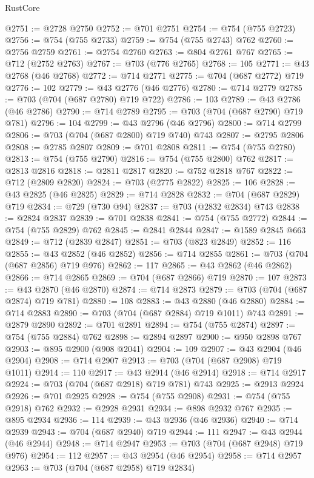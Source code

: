\begin{lexlean}{RustCore}
\begin{coremodule}
@2751 := @2728 @2750
@2752 := @701 @2751
@2754 := @754 (@755 @2723)
@2756 := @754 (@755 @2733)
@2759 := @754 (@755 @2743) @762
@2760 := @2756 @2759
@2761 := @2754 @2760
@2763 := @804 @2761 @767
@2765 := @712 (@2752 @2763)
@2767 := @703 (@776 @2765)
@2768 := 105
@2771 := @43 @2768 (@46 @2768)
@2772 := @714 @2771
@2775 := @704 (@687 @2772) @719
@2776 := 102
@2779 := @43 @2776 (@46 @2776)
@2780 := @714 @2779
@2785 := @703 (@704 (@687 @2780) @719 @722)
@2786 := 103
@2789 := @43 @2786 (@46 @2786)
@2790 := @714 @2789
@2795 := @703 (@704 (@687 @2790) @719 @781)
@2796 := 104
@2799 := @43 @2796 (@46 @2796)
@2800 := @714 @2799
@2806 := @703 (@704 (@687 @2800) @719 @740) @743
@2807 := @2795 @2806
@2808 := @2785 @2807
@2809 := @701 @2808
@2811 := @754 (@755 @2780)
@2813 := @754 (@755 @2790)
@2816 := @754 (@755 @2800) @762
@2817 := @2813 @2816
@2818 := @2811 @2817
@2820 := @752 @2818 @767
@2822 := @712 (@2809 @2820)
@2824 := @703 (@2775 @2822)
@2825 := 106
@2828 := @43 @2825 (@46 @2825)
@2829 := @714 @2828
@2832 := @704 (@687 @2829) @719
@2834 := @729 (@730 @94)
@2837 := @703 (@2832 @2834) @743
@2838 := @2824 @2837
@2839 := @701 @2838
@2841 := @754 (@755 @2772)
@2844 := @754 (@755 @2829) @762
@2845 := @2841 @2844
@2847 := @1589 @2845 @663
@2849 := @712 (@2839 @2847)
@2851 := @703 (@823 @2849)
@2852 := 116
@2855 := @43 @2852 (@46 @2852)
@2856 := @714 @2855
@2861 := @703 (@704 (@687 @2856) @719 @976)
@2862 := 117
@2865 := @43 @2862 (@46 @2862)
@2866 := @714 @2865
@2869 := @704 (@687 @2866) @719
@2870 := 107
@2873 := @43 @2870 (@46 @2870)
@2874 := @714 @2873
@2879 := @703 (@704 (@687 @2874) @719 @781)
@2880 := 108
@2883 := @43 @2880 (@46 @2880)
@2884 := @714 @2883
@2890 := @703 (@704 (@687 @2884) @719 @1011) @743
@2891 := @2879 @2890
@2892 := @701 @2891
@2894 := @754 (@755 @2874)
@2897 := @754 (@755 @2884) @762
@2898 := @2894 @2897
@2900 := @950 @2898 @767
@2903 := @895 @2900 (@908 @2041)
@2904 := 109
@2907 := @43 @2904 (@46 @2904)
@2908 := @714 @2907
@2913 := @703 (@704 (@687 @2908) @719 @1011)
@2914 := 110
@2917 := @43 @2914 (@46 @2914)
@2918 := @714 @2917
@2924 := @703 (@704 (@687 @2918) @719 @781) @743
@2925 := @2913 @2924
@2926 := @701 @2925
@2928 := @754 (@755 @2908)
@2931 := @754 (@755 @2918) @762
@2932 := @2928 @2931
@2934 := @898 @2932 @767
@2935 := @895 @2934
@2936 := 114
@2939 := @43 @2936 (@46 @2936)
@2940 := @714 @2939
@2943 := @704 (@687 @2940) @719
@2944 := 111
@2947 := @43 @2944 (@46 @2944)
@2948 := @714 @2947
@2953 := @703 (@704 (@687 @2948) @719 @976)
@2954 := 112
@2957 := @43 @2954 (@46 @2954)
@2958 := @714 @2957
@2963 := @703 (@704 (@687 @2958) @719 @2834)

\end{coremodule}
\end{lexlean}
